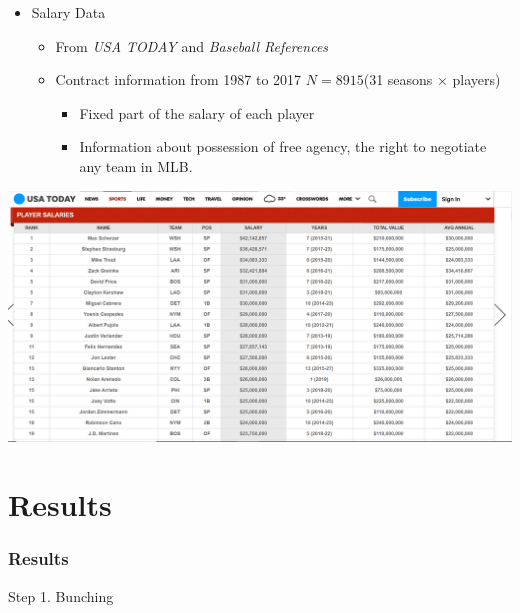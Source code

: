 \documentclass[dvipdfmx,12pt]{beamer}
\begin{document}
\begin{frame}
  \begin{itemize}
    \item Salary Data
    \begin{itemize}
      \item From \textit{USA TODAY} and \textit{Baseball References}

      \item Contract information from 1987 to 2017 $N=8915$(31 seasons $\times$ players)
      \begin{itemize}
        \item Fixed part of the salary of each player

        \item Information about possession of free agency, the right to negotiate any team in MLB.
      \end{itemize}
    \end{itemize}
  \end{itemize}
  \begin{center}
    \includegraphics[keepaspectratio, scale=.3]{output/USATODAY_2.png}
  \end{center}
\end{frame}

\section{Results}

\begin{frame}\frametitle{Results}
  \large
  Step 1. Bunching
\end{frame}
\end{document}

